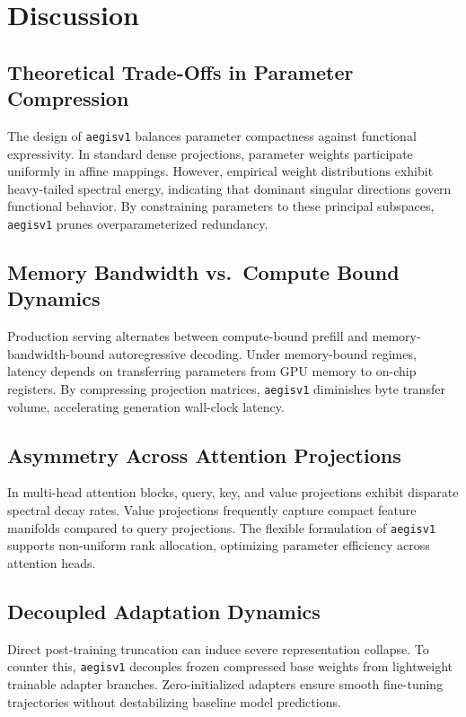 \section{Discussion}

\subsection{Theoretical Trade-Offs in Parameter Compression}
The design of \texttt{aegisv1} balances parameter compactness against functional expressivity. In standard dense projections, parameter weights participate uniformly in affine mappings. However, empirical weight distributions exhibit heavy-tailed spectral energy, indicating that dominant singular directions govern functional behavior. By constraining parameters to these principal subspaces, \texttt{aegisv1} prunes overparameterized redundancy.

\subsection{Memory Bandwidth vs.\ Compute Bound Dynamics}
Production serving alternates between compute-bound prefill and memory-bandwidth-bound autoregressive decoding. Under memory-bound regimes, latency depends on transferring parameters from GPU memory to on-chip registers. By compressing projection matrices, \texttt{aegisv1} diminishes byte transfer volume, accelerating generation wall-clock latency.

\subsection{Asymmetry Across Attention Projections}
In multi-head attention blocks, query, key, and value projections exhibit disparate spectral decay rates. Value projections frequently capture compact feature manifolds compared to query projections. The flexible formulation of \texttt{aegisv1} supports non-uniform rank allocation, optimizing parameter efficiency across attention heads.

\subsection{Decoupled Adaptation Dynamics}
Direct post-training truncation can induce severe representation collapse. To counter this, \texttt{aegisv1} decouples frozen compressed base weights from lightweight trainable adapter branches. Zero-initialized adapters ensure smooth fine-tuning trajectories without destabilizing baseline model predictions.

